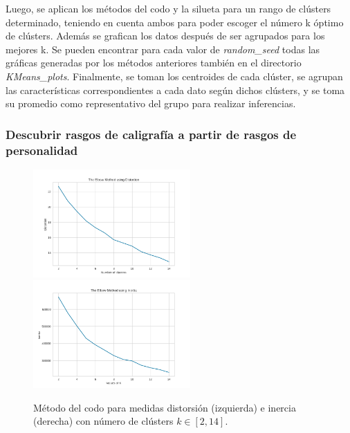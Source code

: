 \documentclass[10pt, a4paper]{article}
\begin{document}
		Luego, se aplican los m\'etodos del codo y la silueta para un rango de cl\'usters determinado, teniendo en cuenta ambos para poder escoger el n\'umero k \'optimo de cl\'usters. Adem\'as se grafican los datos despu\'es de ser agrupados para los mejores k. Se pueden encontrar para cada valor de \textit{random\_seed} todas las gr\'aficas generadas por los m\'etodos anteriores tambi\'en en el directorio \textit{KMeans\_plots}. 
		Finalmente, se toman los centroides de cada cl\'uster, 
		se agrupan las caracter\'isticas correspondientes a cada dato seg\'un dichos cl\'usters, y se toma su promedio como representativo del grupo para realizar inferencias. 
		
		\subsubsection{Descubrir rasgos de caligraf\'ia a partir de rasgos de personalidad}
		
		\begin{figure}[H]
			\centering
			\includegraphics[width = 6cm]{ElbowM_Distortion_bf.png}
			\includegraphics[width = 6cm]{ElbowM_Inertia_bf.png}
			\caption{M\'etodo del codo para medidas distorsi\'on (izquierda) e inercia (derecha) con n\'umero de cl\'usters $k\in[2, 14]$.}
		\end{figure}
	
\end{document}
